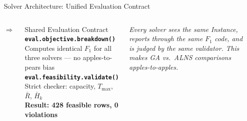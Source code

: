 \documentclass[aspectratio=169,t]{beamer}
\begin{document}
\begin{frame}{Solver Architecture: Unified Evaluation Contract}
\begin{columns}[c]
\centering
\Large$\Rightarrow$

\begin{block}{Shared Evaluation Contract}
  \scriptsize
  \textbf{\texttt{eval.objective.breakdown()}}\\
  Computes identical $F_1$ for all three solvers ---
  no apples-to-pears bias\\[5pt]
  \textbf{\texttt{eval.feasibility.validate()}}\\
  Strict checker: capacity, $T_{\max}$, $\bar{R}$, $\bar{H}_k$\\[5pt]
  \textcolor{gacolor}{\textbf{Result: 428 feasible rows, 0 violations}}
\end{block}
\vspace{4pt}
{\scriptsize\textit{Every solver sees the same Instance, reports through
the same $F_1$ code, and is judged by the same validator.
This makes GA vs.\ ALNS comparisons apples-to-apples.}}

\end{columns}
\end{frame}
\end{document}
